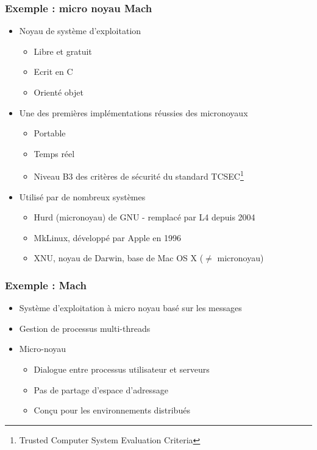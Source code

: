 \begin{frame}
\frametitle{Exemple : micro noyau Mach}
\begin{itemize}
\item Noyau de système d'exploitation
\begin{itemize}
\item Libre et gratuit
\item Ecrit en C
\item Orienté objet
\end{itemize}
\item Une des premières implémentations réussies des micronoyaux
\begin{itemize}
\item Portable
\item Temps réel
\item Niveau B3 des critères de sécurité du standard TCSEC\footnote{Trusted Computer System Evaluation Criteria}
\end{itemize}
\item Utilisé par de nombreux systèmes
\begin{itemize}
\item Hurd (micronoyau) de GNU - remplacé par L4 depuis 2004
\item MkLinux, développé par Apple en 1996
\item XNU, noyau de Darwin, base de Mac OS X ($\ne$ micronoyau)
\end{itemize}

\end{itemize}
\end{frame}

\begin{frame}
\frametitle{Exemple : Mach}
\begin{itemize}
\item Système d’exploitation à micro noyau basé sur les messages
\item Gestion de processus multi-threads
\item Micro-noyau
\begin{itemize}
\item Dialogue entre processus utilisateur et serveurs
\item Pas de partage d’espace d’adressage
\item Conçu pour les environnements distribués
\end{itemize}
\end{itemize}
\end{frame}

